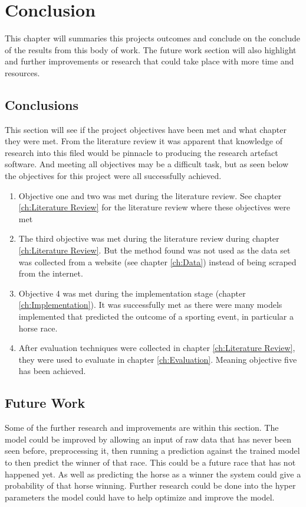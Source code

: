 \chapter{Conclusion}\label{ch:Conclusion}

This chapter will summaries this projects outcomes and conclude on the conclude of the results from this body of work. The future work section will also highlight and further improvements or research that could take place with more time and resources. 


\section{Conclusions}
This section will see if the project objectives have been met and what chapter they were met. From the literature review it was apparent that knowledge of research into this filed would be pinnacle to producing the research artefact software. And meeting all objectives may be a difficult task, but as seen below the objectives for this project were all successfully achieved.
\begin{enumerate}
    \item Objective one and two was met during the literature review. See chapter \ref{ch:Literature Review} for the literature review where these objectives were met
    \item The third objective was met during the literature review during chapter \ref{ch:Literature Review}. But the method found was not used as the data set was collected from a website (see chapter \ref{ch:Data}) instead of being scraped from the internet.
    \item Objective 4 was met during the implementation stage (chapter \ref{ch:Implementation}). It was successfully met as there were many models implemented that predicted the outcome of a sporting event, in particular a horse race.
    \item After evaluation techniques were collected in chapter \ref{ch:Literature Review}, they were used to evaluate in chapter \ref{ch:Evaluation}. Meaning objective five has been achieved. 
\end{enumerate}

\section{Future Work}
Some of the further research and improvements are within this section. The model could be improved by allowing an input of raw data that has never been seen before, preprocessing it, then running a prediction against the trained model to then predict the winner of that race. This could be a future race that has not happened yet. As well as predicting the horse as a winner the system could give a probability of that horse winning. Further research could be done into the hyper parameters the model could have to help optimize and improve the model. 